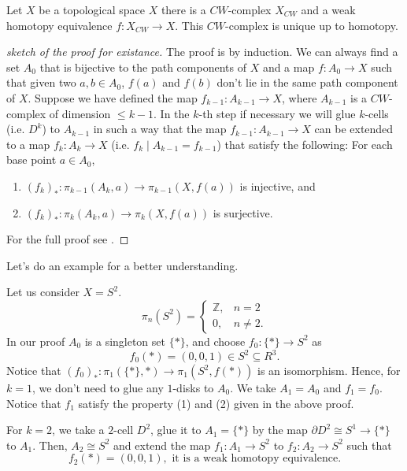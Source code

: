 \begin{theorem}
	Let $X$ be a topological space $X$ there is a $CW$-complex $X_{CW}$ and a weak homotopy equivalence $f: X_{CW} \to X$. 
	This $CW$-complex is unique up to homotopy.
\end{theorem}
\begin{proof}[sketch of the proof for existance]
	The proof is by induction.
	We can always find a set $A_0$ that is bijective to the path components of $X$ and a map $f: A_0 \to X$ such that given two $a,b \in A_0$, $f(a)$ and $f(b)$ don't lie in the same path component of $X$.
	Suppose we have defined the map $f_{k-1}: A_{k-1} \to X$, where $A_{k-1}$ is a $CW$-complex of dimension $\leq k-1$.
	In the $k$-th step if necessary we will glue $k$-cells (i.e. $D^k$) to $A_{k-1}$ in such a way that the map $f_{k-1}: A_{k-1} \to X$ can be extended to a map $f_k: A_k \to X$ (i.e. $f_k\mid A_{k-1} = f_{k-1}$) that satisfy the following: 
	For each base point $a \in A_0$,
	\begin{enumerate}
		\item $(f_k)_\ast : \pi_{k-1}(A_k, a) \to \pi_{k-1}(X, f(a))$ is injective, and
		\item $(f_k)_\ast : \pi_{k}(A_k, a) \to \pi_{k}(X, f(a))$ is surjective.
	\end{enumerate}
	For the full proof see \cite[\S4.1]{Hatcher2002}.
\end{proof}
Let's do an example for a better understanding.
\begin{example}
	Let us consider $X = S^2$.
	\[\pi_n(S^2) = \left\{\begin{array}{ll}
		\mathbb{Z}, & n=2\\
		0, & n \neq 2. 
	\end{array}\right.\]
	In our proof $A_0$ is a singleton set $\{\ast\}$, and choose $f_0: \{\ast\} \to S^2$ as 
	\[f_0(\ast) = (0,0,1) \in S^2 \subseteq R^3.\]
	Notice that $(f_0)_\ast : \pi_1(\{\ast\}, \ast) \to \pi_1(S^2, f(\ast))$ is an isomorphism.
	Hence, for $k =1$, we don't need to glue any $1$-disks to $A_0$.
	We take $A_1 = A_0$ and $f_1 = f_0$.
	Notice that $f_1$ satisfy the property (1) and (2) given in the above proof.
	
	For $k =2$, we take a $2$-cell $D^2$, glue it to $A_1= \{\ast\}$ by the map $\partial D^2 \cong S^1 \to \{\ast\}$ to $A_1$.
	Then, $A_2 \cong S^2$ and extend the map $f_1: A_1 \to S^2$ to $f_2: A_2 \to S^2$ such that 
	\[f_2(\ast) = (0,0,1), \text{ it is a weak homotopy equivalence.}\]
\end{example}

